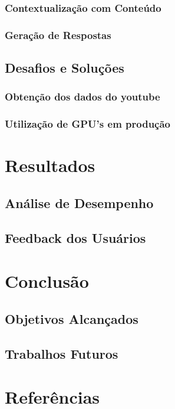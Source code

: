 \documentclass[tcc,capa]{texufpel}
\begin{document}
\subsection{Contextualização com Conteúdo}
\subsection{Geração de Respostas}

\section{Desafios e Soluções}
\subsection{Obtenção dos dados do youtube}
\subsection{Utilização de GPU's em produção}


\chapter{Resultados}
\section{Análise de Desempenho}
\section{Feedback dos Usuários}

\chapter{Conclusão}
\section{Objetivos Alcançados}
\section{Trabalhos Futuros}

\chapter{Referências}


\end{document}
